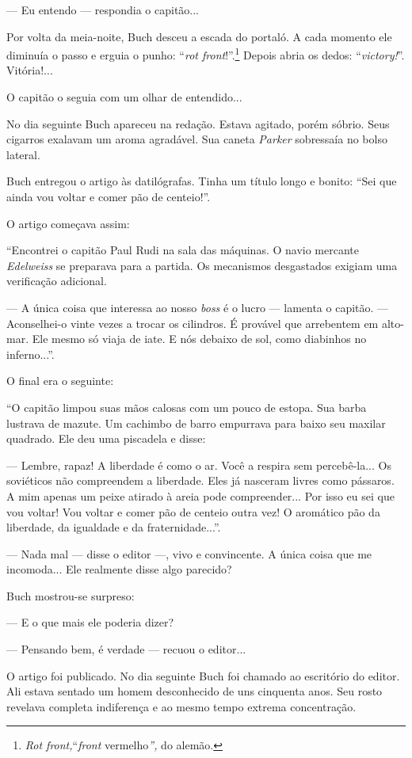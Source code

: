 --- Eu entendo --- respondia o capitão...

Por volta da meia-noite, Buch desceu a escada do portaló. A cada momento
ele diminuía o passo e erguia o punho: ``\emph{rot front}!''.\footnote{\emph{Rot
  front,}``\emph{front} vermelho\emph{'',} do alemão.} Depois abria os
dedos: ``\emph{victory!}''. Vitória!...

O capitão o seguia com um olhar de entendido...

No dia seguinte Buch apareceu na redação. Estava agitado, porém sóbrio.
Seus cigarros exalavam um aroma agradável. Sua caneta \emph{Parker}
sobressaía no bolso lateral.

Buch entregou o artigo às datilógrafas. Tinha um título longo e bonito:
``Sei que ainda vou voltar e comer pão de centeio!''.

O artigo começava assim:

``Encontrei o capitão Paul Rudi na sala das máquinas. O navio mercante
\emph{Edelweiss} se preparava para a partida. Os mecanismos desgastados
exigiam uma verificação adicional.

--- A única coisa que interessa ao nosso \emph{boss} é o lucro ---
lamenta o capitão. --- Aconselhei-o vinte vezes a trocar os cilindros. É
provável que arrebentem em alto-mar. Ele mesmo só viaja de iate. E nós
debaixo de sol, como diabinhos no inferno...''.

O final era o seguinte:

``O capitão limpou suas mãos calosas com um pouco de estopa. Sua barba
lustrava de mazute. Um cachimbo de barro empurrava para baixo seu
maxilar quadrado. Ele deu uma piscadela e disse:

--- Lembre, rapaz! A liberdade é como o ar. Você a respira sem
percebê-la... Os soviéticos não compreendem a liberdade. Eles já
nasceram livres como pássaros. A mim apenas um peixe atirado à areia
pode compreender... Por isso eu sei que vou voltar! Vou voltar e comer
pão de centeio outra vez! O aromático pão da liberdade, da igualdade e
da fraternidade...''.

--- Nada mal --- disse o editor ---, vivo e convincente. A única coisa
que me incomoda... Ele realmente disse algo parecido?

Buch mostrou-se surpreso:

--- E o que mais ele poderia dizer?

--- Pensando bem, é verdade --- recuou o editor...

O artigo foi publicado. No dia seguinte Buch foi chamado ao escritório
do editor. Ali estava sentado um homem desconhecido de uns cinquenta
anos. Seu rosto revelava completa indiferença e ao mesmo tempo extrema
concentração.

